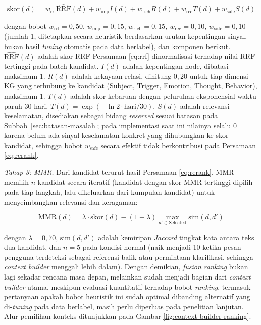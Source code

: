\begin{equation}
\mathrm{skor}(d) = w_{\mathrm{rrf}} \widehat{\mathrm{RRF}}(d) + w_{\mathrm{imp}} I(d) + w_{\mathrm{rich}} R(d) + w_{\mathrm{rec}} T(d) + w_{\mathrm{safe}} S(d)
\label{eq:rerank}
\end{equation}

dengan bobot $w_{\mathrm{rrf}}=0{,}50$, $w_{\mathrm{imp}}=0{,}15$, $w_{\mathrm{rich}}=0{,}15$, $w_{\mathrm{rec}}=0{,}10$, $w_{\mathrm{safe}}=0{,}10$ (jumlah 1, ditetapkan secara heuristik berdasarkan urutan kepentingan sinyal, bukan hasil \textit{tuning} otomatis pada data berlabel), dan komponen berikut. $\widehat{\mathrm{RRF}}(d)$ adalah skor RRF Persamaan \ref{eq:rrf} dinormalisasi terhadap nilai RRF tertinggi pada batch kandidat. $I(d)$ adalah kepentingan node, dibatasi maksimum 1. $R(d)$ adalah kekayaan relasi, dihitung $0{,}20$ untuk tiap dimensi KG yang terhubung ke kandidat (Subject, Trigger, Emotion, Thought, Behavior), maksimum 1. $T(d)$ adalah skor kebaruan dengan peluruhan eksponensial waktu paruh 30 hari, $T(d) = \exp(-\ln 2 \cdot \mathrm{hari}/30)$. $S(d)$ adalah relevansi keselamatan, disediakan sebagai bidang \textit{reserved} sesuai batasan pada Subbab~\ref{sec:batasan-masalah}; pada implementasi saat ini nilainya selalu 0 karena belum ada sinyal keselamatan konkret yang dihubungkan ke skor kandidat, sehingga bobot $w_{\mathrm{safe}}$ secara efektif tidak berkontribusi pada Persamaan \ref{eq:rerank}.

\textit{Tahap 3: MMR.} Dari kandidat terurut hasil Persamaan \ref{eq:rerank}, MMR memilih $n$ kandidat secara iteratif (kandidat dengan skor MMR tertinggi dipilih pada tiap langkah, lalu dikeluarkan dari kumpulan kandidat) untuk menyeimbangkan relevansi dan keragaman:

\begin{equation}
\mathrm{MMR}(d) = \lambda \cdot \mathrm{skor}(d) - (1-\lambda) \max_{d' \in \mathrm{Selected}} \mathrm{sim}(d, d')
\label{eq:mmr}
\end{equation}

dengan $\lambda = 0{,}70$, $\mathrm{sim}(d,d')$ adalah kemiripan \textit{Jaccard} tingkat kata antara teks dua kandidat, dan $n=5$ pada kondisi normal (naik menjadi 10 ketika pesan pengguna terdeteksi sebagai referensi balik atau permintaan klarifikasi, sehingga \textit{context builder} menggali lebih dalam). Dengan demikian, \textit{fusion ranking} bukan lagi sekadar rencana masa depan, melainkan sudah menjadi bagian dari \textit{context builder} utama, meskipun evaluasi kuantitatif terhadap bobot \textit{ranking}, termasuk pertanyaan apakah bobot heuristik ini sudah optimal dibanding alternatif yang di-\textit{tuning} pada data berlabel, masih perlu diperluas pada penelitian lanjutan. Alur pemilihan konteks ditunjukkan pada Gambar \ref{fig:context-builder-ranking}.

